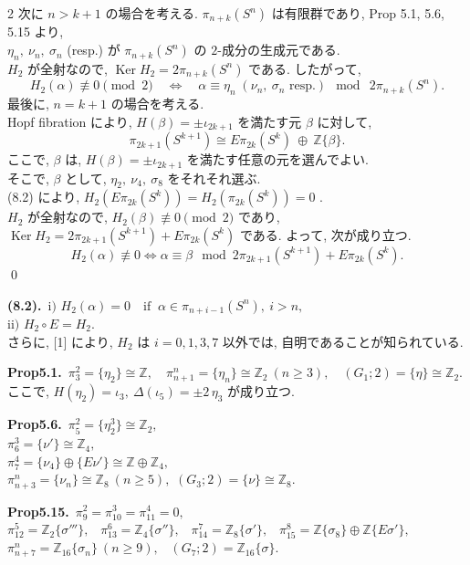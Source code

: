 \documentclass[10pt, leqno]{ltjsarticle}
\newcommand{\Ex}{E}        %
\newcommand{\gen}[1]{\{#1\}}       %
\newcommand{\Ker}{\operatorname{Ker}}
\newcommand{\pis}[2]{\pi_{#1}(#2)}       %
\newcommand{\z}{\mathbb{Z}}
\numberwithin{equation}{section}
\theoremstyle{plain}
\theoremstyle{definition}
\theoremstyle{remark}
\begin{document}
\begin{paracol}{2}
次に \(n>k+1\) の場合を考える. 
\(\pis{n+k}{S^n}\) は有限群であり, 
Prop 5.1, 5.6, 5.15 より,\\
\(\eta_n,\ \nu_n,\ \sigma_n\) (resp.) が
\(\pis{n+k}{S^n}\) の \(2\)-成分の生成元である. \\
\(H_2\) が全射なので, \(\Ker H_2 = 2\pis{n+k}{S^n}\) である.
したがって, 
\[
H_2(\alpha)\not\equiv0\pmod2
\quad\Longleftrightarrow\quad
\alpha\equiv
\eta_n\;(\nu_n, \ \sigma_n \text{ resp.})
\ \bmod\ 2\pis{n+k}{S^n}.
\]
最後に, \(n=k+1\) の場合を考える.\\
Hopf fibration により,
\(H(\beta)=\pm\iota_{2k+1}\) を満たす元 \(\beta\)
に対して,
\[
\pis{2k+1}{S^{k+1}}
\cong E\pis{2k}{S^k}\ \oplus\ \z\gen{\beta}.
\]
ここで, \(\beta\) は, 
\(H(\beta) = \pm\iota_{2k+1}\) を満たす任意の元を選んでよい.\\
そこで, \(\beta\) として, 
\(\eta_2,\ \nu_4,\ \sigma_8\) をそれそれ選ぶ.\\
(8.2) により, 
\(H_2(E\pi_{2k}(S^k)) = H_2(\pis{2k}{S^k}) = 0\) .\\
\(H_2\) が全射なので, 
\(H_2(\beta)\not\equiv0 \pmod2\) であり,\\
\(\Ker H_2 = 2\pis{2k+1}{S^{k+1}} + E\pis{2k}{S^k}\) である.
よって, 次が成り立つ.
\[
H_2(\alpha)\not\equiv 0 
\Longleftrightarrow
\alpha\equiv \beta \mod 2\pis{2k+1}{S^{k+1}} + E\pis{2k}{S^k} .
\]
\qed

\switchcolumn

\noindent
\textbf{(8.2).}\
\(\text{i) } H_2(\alpha)=0\quad \text{if }\ \alpha\in \pis{n+i-1}{S^n},\ i>n,\)\\
\(\text{ii) } H_2\circ \Ex = H_2 .\)\\
さらに, [1] により,
\(H_2\) は \(i=0,1,3,7\) 以外では, 自明であることが知られている.

\noindent
\textbf{Prop5.1.}\
\(\pi^{2}_{3}=\gen{\eta_2}\cong\mathbb Z,\quad
\pi^{n}_{n+1}=\gen{\eta_n}\cong\mathbb Z_2\ (n\ge3),\quad
(G_1;2)=\gen{\eta}\cong\mathbb Z_2.\) \\
ここで, 
\(H(\eta_2)=\iota_3,\ \Delta(\iota_5)=\pm 2\,\eta_3\) が成り立つ. 

\noindent
\textbf{Prop5.6.}\
\(\pi^{2}_{5}=\gen{\eta_{2}^{3}}\cong \mathbb Z_{2},\) \\
\(\pi^{3}_{6}=\gen{\nu'}\cong \mathbb Z_{4},\) \\
\(\pi^{4}_{7}=\gen{\nu_{4}}\oplus \gen{E\nu'}\cong \mathbb Z\oplus\mathbb Z_{4},\) \\
\(\pi^{n}_{n+3}=\gen{\nu_{n}}\cong \mathbb Z_{8}\ (n\ge5),\)\qquad
\((G_{3};2)=\gen{\nu}\cong \mathbb Z_{8}.\)

\noindent
\textbf{Prop5.15.}\
\(\pi_9^2=\pi_{10}^3=\pi_{11}^4=0,\) \\
\(\pi^{5}_{12}=\mathbb Z_2\gen{\sigma'''},\) \
\(\pi^{6}_{13}=\mathbb Z_4\gen{\sigma''},\) \
\(\pi^{7}_{14}=\mathbb Z_8\gen{\sigma'},\) \
\(\pi^{8}_{15}=\mathbb Z\gen{\sigma_8}\oplus\mathbb Z\gen{E\sigma'},\) \\
\(\pi^{n}_{n+7}=\mathbb Z_{16}\gen{\sigma_n}\ (n\ge9),\) \
\((G_{7};2)=\mathbb Z_{16}\gen{\sigma}.\)



\end{paracol}
\end{document}

